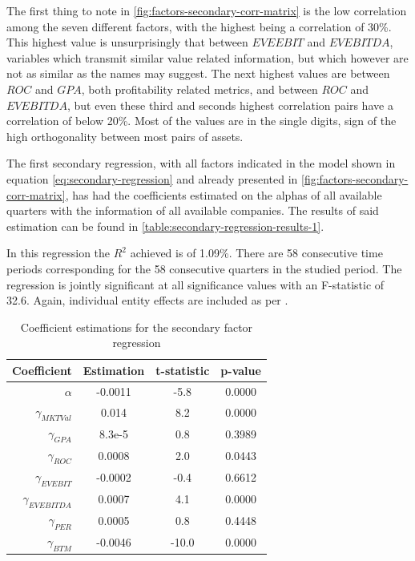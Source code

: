 The first thing to note in \autoref{fig:factors-secondary-corr-matrix} is the low correlation among the seven different factors, with the highest being a correlation of 30\%. This highest value is unsurprisingly that between $EVEEBIT$ and $EVEBITDA$, variables which transmit similar value related information, but which however are not as similar as the names may suggest. The next highest values are between $ROC$ and $GPA$, both profitability related metrics, and between $ROC$ and $EVEBITDA$, but even these third and seconds highest correlation pairs have a correlation of below 20\%. Most of the values are in the single digits, sign of the high orthogonality between most pairs of assets. 

The first secondary regression, with all factors indicated in the model shown in equation \eqref{eq:secondary-regression} and already presented in \autoref{fig:factors-secondary-corr-matrix}, has had the coefficients estimated on the alphas of all available quarters with the information of all available companies. The results of said estimation can be found in \autoref{table:secondary-regression-results-1}.

In this regression the $R^2$ achieved is of 1.09\%. There are 58 consecutive time periods corresponding for the 58 consecutive quarters in the studied period. The regression is jointly significant at all significance values with an F-statistic of 32.6. Again, individual entity effects are included as per \cite{ian_wagner_2019}. 
\newpage
\begin{table}[ht]
    \centering
    \begin{tabular}{rccc}
        \toprule
        Coefficient & Estimation & t-statistic & p-value \\ 
        \midrule
        $\alpha$ & -0.0011 & -5.8 & 0.0000 \\
        $\gamma_{MKTVal}$ & 0.014 & 8.2 & 0.0000 \\
        $\gamma_{GPA}$ & 8.3e-5 & 0.8 & 0.3989 \\
        $\gamma_{ROC}$ & 0.0008 & 2.0 & 0.0443 \\
        $\gamma_{EVEBIT}$ & -0.0002 & -0.4 & 0.6612 \\
        $\gamma_{EVEBITDA}$ & 0.0007 & 4.1 & 0.0000 \\
        $\gamma_{PER}$ & 0.0005 & 0.8 & 0.4448 \\
        $\gamma_{BTM}$ & -0.0046 & -10.0 & 0.0000 \\
        \bottomrule
    \end{tabular}
    \caption{Coefficient estimations for the secondary factor regression}
    \label{table:secondary-regression-results-1}
\end{table}

